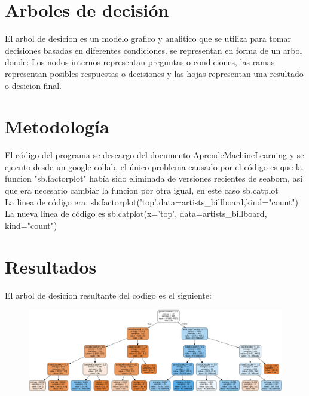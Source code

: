 \section{Arboles de decisión}
El arbol de desicion es un modelo grafico y analitico que se utiliza para tomar decisiones  basadas en diferentes condiciones. se representan en forma de un arbol donde: Los nodos internos representan preguntas o condiciones, las ramas representan posibles respuestas o decisiones  y las hojas representan una resultado o desicion final.

\section{Metodología}
El código del programa se descargo del documento AprendeMachineLearning y se ejecuto desde un google collab, el único problema causado por el código es que la funcion "sb.factorplot" había sido eliminada de versiones recientes de seaborn, asi que era necesario cambiar la funcion por otra igual, en este caso sb.catplot\\

La linea de código era: sb.factorplot('top',data=artists\_billboard,kind="count") \\
La nueva linea de código es sb.catplot(x='top', data=artists\_billboard, kind="count")

\section{Resultados}
El arbol de desicion resultante del codigo es el siguiente:
\begin{figure}[H]
    \centering
    \includegraphics[width=1\linewidth]{resultados.png}
\end{figure}